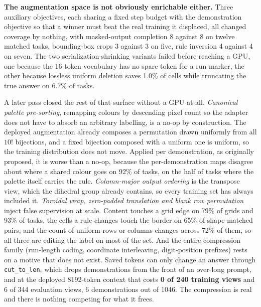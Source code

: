 \documentclass[11pt]{article}
\begin{document}
\textbf{The augmentation space is not obviously enrichable either.} Three auxiliary objectives, each
sharing a fixed step budget with the demonstration objective so that a winner must beat the real
training it displaced, all changed coverage by nothing, with masked-output completion 8 against 8 on
twelve matched tasks, bounding-box crops 3 against 3 on five, rule inversion 4 against 4 on seven.
The two serialization-shrinking variants failed before reaching a GPU, one because the 16-token
vocabulary has no spare token for a run marker, the other because lossless uniform deletion saves
1.0\% of cells while truncating the true answer on 6.7\% of tasks.

A later pass closed the rest of that surface without a GPU at all. \emph{Canonical palette
pre-sorting}, remapping colours by descending pixel count so the adapter does not have to absorb an
arbitrary labelling, is a no-op by construction. The deployed augmentation already composes a
permutation drawn uniformly from all $10!$ bijections, and a fixed bijection composed with a uniform
one is uniform, so the training distribution does not move. Applied per demonstration, as originally
proposed, it is worse than a no-op, because the per-demonstration maps disagree about where a shared
colour goes on 92\% of tasks, on the half of tasks where the palette itself carries the rule.
\emph{Column-major output ordering} is the transpose view, which the dihedral group already contains,
so every training set has always included it. \emph{Toroidal wrap, zero-padded translation and blank
row permutation} inject false supervision at scale. Content touches a grid edge on 79\% of grids and
93\% of tasks, the cells a rule changes touch the border on 65\% of shape-matched pairs, and the
count of uniform rows or columns changes across 72\% of them, so all three are editing the label on
most of the set. And the entire compression family (run-length coding, coordinate interleaving,
digit-position prefixes) rests on a motive that does not exist. Saved tokens can only change an
answer through \texttt{cut\_to\_len}, which drops demonstrations from the front of an over-long
prompt, and at the deployed 8192-token context that costs \textbf{0 of 240 training views} and 6 of 344
evaluation views, 6 demonstrations out of 1046. The compression is real and there is nothing
competing for what it frees.
\end{document}
